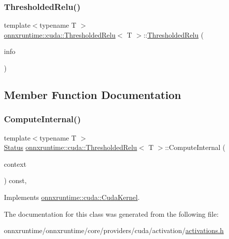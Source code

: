 \subsubsection{\texorpdfstring{Thresholded\+Relu()}{ThresholdedRelu()}}
{\footnotesize\ttfamily template$<$typename T $>$ \\
\mbox{\hyperlink{classonnxruntime_1_1cuda_1_1ThresholdedRelu}{onnxruntime\+::cuda\+::\+Thresholded\+Relu}}$<$ T $>$\+::\mbox{\hyperlink{classonnxruntime_1_1cuda_1_1ThresholdedRelu}{Thresholded\+Relu}} (\begin{DoxyParamCaption}\item[{const \mbox{\hyperlink{classonnxruntime_1_1OpKernelInfo}{Op\+Kernel\+Info}} \&}]{info }\end{DoxyParamCaption})\hspace{0.3cm}{\ttfamily [inline]}}



\subsection{Member Function Documentation}
\mbox{\label{classonnxruntime_1_1cuda_1_1ThresholdedRelu_a867604561536f8e8b095b2ab5f676ba8}} 
\subsubsection{\texorpdfstring{Compute\+Internal()}{ComputeInternal()}}
{\footnotesize\ttfamily template$<$typename T $>$ \\
\mbox{\hyperlink{classonnxruntime_1_1common_1_1Status}{Status}} \mbox{\hyperlink{classonnxruntime_1_1cuda_1_1ThresholdedRelu}{onnxruntime\+::cuda\+::\+Thresholded\+Relu}}$<$ T $>$\+::Compute\+Internal (\begin{DoxyParamCaption}\item[{\mbox{\hyperlink{classonnxruntime_1_1OpKernelContext}{Op\+Kernel\+Context}} $\ast$}]{context }\end{DoxyParamCaption}) const\hspace{0.3cm}{\ttfamily [override]}, {\ttfamily [virtual]}}



Implements \mbox{\hyperlink{classonnxruntime_1_1cuda_1_1CudaKernel_aca7af04ae448017d6023d30bba231ebb}{onnxruntime\+::cuda\+::\+Cuda\+Kernel}}.



The documentation for this class was generated from the following file\+:\begin{DoxyCompactItemize}
\item 
onnxruntime/onnxruntime/core/providers/cuda/activation/\mbox{\hyperlink{cuda_2activation_2activations_8h}{activations.\+h}}\end{DoxyCompactItemize}
